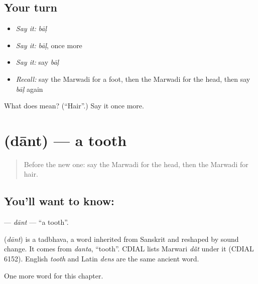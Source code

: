 \subsection*{Your turn}
\begin{itemize}
\raggedright
  \item \emph{Say it:} \emph{bāḷ}
  \item \emph{Say it:} \emph{bāḷ}, once more
  \item \emph{Say it:} say \emph{bāḷ}
  \item \emph{Recall:} say the Marwadi for a foot, then the Marwadi for the head, then say \emph{bāḷ} again
\end{itemize}

\begin{tcolorbox}[breakable,colback=teal!4,colframe=teal!35!black,title={Before you move on}]
What does  mean? (\textquotedblleft{}Hair\textquotedblright{}.) Say it once more.
\end{tcolorbox}
\section[\texorpdfstring{\mw{दांत} (dānt)}{दांत (dānt)}]{ (dānt) — a tooth}

\label{lesson:MW-C44-dant}



\begin{quote}
Before the new one: say the Marwadi for the head, then the Marwadi for hair.
\end{quote}

\subsection*{You'll want to know: }
\textbf{} — \emph{dānt} — \textquotedblleft{}a tooth\textquotedblright{}.

\begin{cousinweb}
\textbf{} (\emph{dānt}) is a tadbhava, a word inherited from Sanskrit and reshaped by sound change. It comes from \emph{danta}, \textquotedblleft{}tooth\textquotedblright{}. CDIAL lists Marwari \emph{dā̃t} under it (CDIAL 6152). English \emph{tooth} and Latin \emph{dens} are the same ancient word.
\end{cousinweb}

\begin{grammarlens}[title={What you've built}]
One more word for this chapter.
\end{grammarlens}

